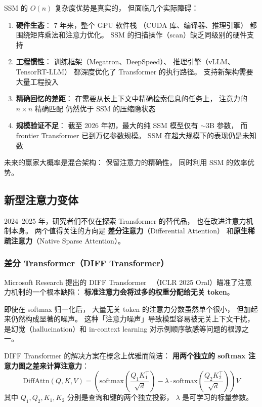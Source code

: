 \begin{whybox}
SSM 的 $O(n)$ 复杂度优势是真实的，
但面临几个实际障碍：
\begin{enumerate}[noitemsep]
  \item \textbf{硬件生态}：
        7 年来，整个 GPU 软件栈
        （CUDA 库、编译器、推理引擎）
        都围绕矩阵乘法和注意力优化。
        SSM 的扫描操作（scan）缺乏同级别的硬件支持
  \item \textbf{工程惯性}：
        训练框架（Megatron、DeepSpeed）、
        推理引擎（vLLM、TensorRT-LLM）
        都深度优化了 Transformer 的执行路径。
        支持新架构需要大量工程投入
  \item \textbf{精确回忆的差距}：
        在需要从长上下文中精确检索信息的任务上，
        注意力的 $n \times n$ 精确匹配
        仍然优于 SSM 的压缩隐状态
  \item \textbf{规模验证不足}：
        截至 2026 年初，最大的纯 SSM 模型仅有 $\sim$3B 参数，
        而 frontier Transformer 已到万亿参数规模。
        SSM 在超大规模下的表现仍是未知数
\end{enumerate}
未来的赢家大概率是混合架构：
保留注意力的精确性，
同时利用 SSM 的效率优势。
\end{whybox}

\subsection{新型注意力变体}
\label{sec:new-attention-variants}

2024--2025 年，研究者们不仅在探索 Transformer 的替代品，
也在改进注意力机制本身。
两个值得关注的方向是
\textbf{差分注意力}（Differential Attention）
和\textbf{原生稀疏注意力}（Native Sparse Attention）。

\subsubsection{差分 Transformer（DIFF Transformer）}

Microsoft Research 提出的 DIFF Transformer~\cite{ye2024diff}
（ICLR 2025 Oral）瞄准了注意力机制的一个根本缺陷：
\textbf{标准注意力会将过多的权重分配给无关 token}。

即使在 softmax 归一化后，
大量无关 token 的注意力分数虽然单个很小，
但加起来仍然构成显著的噪声。
这种「注意力噪声」导致模型容易被无关上下文干扰，
是幻觉（hallucination）和 in-context learning
对示例顺序敏感等问题的根源之一。

DIFF Transformer 的解决方案在概念上优雅而简洁：
\textbf{用两个独立的 softmax 注意力图之差来计算注意力}：
\begin{equation}
  \mathrm{DiffAttn}(Q, K, V) =
  \left(\mathrm{softmax}\!\left(\frac{Q_1 K_1^\top}{\sqrt{d}}\right)
  - \lambda \cdot \mathrm{softmax}\!\left(\frac{Q_2 K_2^\top}{\sqrt{d}}\right)\right) V
\end{equation}
其中 $Q_1, Q_2, K_1, K_2$ 分别是查询和键的两个独立投影，
$\lambda$ 是可学习的标量参数。

